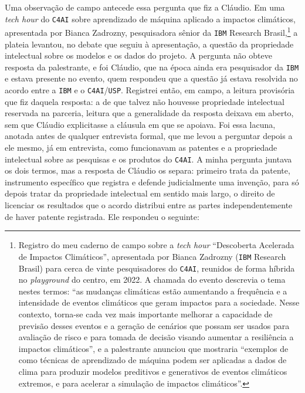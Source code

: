 Uma observação de campo antecede essa pergunta que fiz a Cláudio. Em uma \textit{tech hour} do \texttt{C4AI} sobre aprendizado de máquina aplicado a impactos climáticos, apresentada por Bianca Zadrozny, pesquisadora sênior da \texttt{IBM} Research Brasil,\footnote{Registro do meu caderno de campo sobre a \textit{tech hour} \enquote{Descoberta Acelerada de Impactos Climáticos}, apresentada por Bianca Zadrozny (\texttt{IBM} Research Brasil) para cerca de vinte pesquisadores do \texttt{C4AI}, reunidos de forma híbrida no \textit{playground} do centro, em 2022. A chamada do evento descrevia o tema nestes termos: \enquote{as mudanças climáticas estão aumentando a frequência e a intensidade de eventos climáticos que geram impactos para a sociedade. Nesse contexto, torna-se cada vez mais importante melhorar a capacidade de previsão desses eventos e a geração de cenários que possam ser usados para avaliação de risco e para tomada de decisão visando aumentar a resiliência a impactos climáticos}, e a palestrante anunciou que mostraria \enquote{exemplos de como técnicas de aprendizado de máquina podem ser aplicadas a dados de clima para produzir modelos preditivos e generativos de eventos climáticos extremos, e para acelerar a simulação de impactos climáticos}.} a plateia levantou, no debate que seguiu à apresentação, a questão da propriedade intelectual sobre os modelos e os dados do projeto. A pergunta não obteve resposta da palestrante, e foi Cláudio, que na época ainda era pesquisador da \texttt{IBM} e estava presente no evento, quem respondeu que a questão já estava resolvida no acordo entre a \texttt{IBM} e o \texttt{C4AI}/\texttt{USP}. Registrei então, em campo, a leitura provisória que fiz daquela resposta: a de que talvez não houvesse propriedade intelectual reservada na parceria, leitura que a generalidade da resposta deixava em aberto, sem que Cláudio explicitasse a cláusula em que se apoiava. Foi essa lacuna, anotada antes de qualquer entrevista formal, que me levou a perguntar depois a ele mesmo, já em entrevista, como funcionavam as patentes e a propriedade intelectual sobre as pesquisas e os produtos do \texttt{C4AI}. A minha pergunta juntava os dois termos, mas a resposta de Cláudio os separa: primeiro trata da patente, instrumento específico que registra e defende judicialmente uma invenção, para só depois tratar da propriedade intelectual em sentido mais largo, o direito de licenciar os resultados que o acordo distribui entre as partes independentemente de haver patente registrada. Ele respondeu o seguinte:


